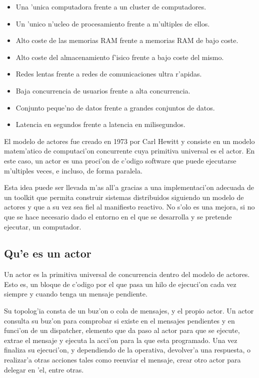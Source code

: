 \documentclass[12pt]{article}
\begin{document}
\begin{itemize}
	\item Una 'unica computadora frente a un cluster de computadores.
	\item Un 'unico n'ucleo de procesamiento frente a m'ultiples de ellos.
	\item Alto coste de las memorias RAM frente a memorias RAM de bajo coste.
	\item Alto coste del almacenamiento f'isico frente a bajo coste del mismo.
    \item Redes lentas frente a redes de comunicaciones ultra r'apidas.
    \item Baja concurrencia de usuarios frente a alta concurrencia.
    \item Conjunto peque'no de datos frente a grandes conjuntos de datos.
    \item Latencia en segundos frente a latencia en milisegundos.
\end{itemize}

El modelo de actores fue creado en 1973 por Carl Hewitt y consiste en un modelo
matem'atico de computaci'on concurrente cuya primitiva universal es el actor. En este caso, un actor es
una proci'on de c'odigo software que puede ejecutarse m'ultiples veces, e incluso,
de forma paralela.

Esta idea puede ser llevada m'as all'a gracias a una implementaci'on adecuada de un toolkit
que permita construir sistemas distribuidos siguiendo un modelo de actores y que a su vez
sea fiel al manifiesto reactivo. No s'olo es una mejora, si no que se hace necesario dado
el entorno en el que se desarrolla y se pretende ejecutar, un computador.

\subsection{Qu'e es un actor}
\label{sub:que es un actor}
Un actor es la primitiva universal de concurrencia dentro del modelo de actores. Esto es,
un bloque de c'odigo por el que pasa un hilo de ejecuci'on cada vez siempre y cuando
tenga un mensaje pendiente.

Su topolog'ia consta de un buz'on o cola de mensajes, y el propio actor. Un actor consulta su
buz'on para comprobar si existe en el mensajes pendientes y en funci'on de un dispatcher, elemento
que da paso al actor para que se ejecute, extrae el mensaje y ejecuta la acci'on para la que
esta programado. Una vez finaliza su ejecuci'on, y dependiendo de la operativa, devolver'a una
respuesta, o realizar'a otras acciones tales como reenviar el mensaje, crear otro actor
para delegar en 'el, entre otras.
\end{document}
